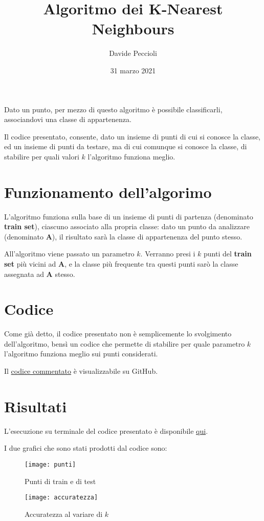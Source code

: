 \documentclass[a4paper]{article}
\title{Algoritmo dei K-Nearest Neighbours}
\date{31 marzo 2021}
\author{Davide Peccioli}
\begin{document}
\maketitle

Dato un punto, per mezzo di questo algoritmo è possibile classificarli, associandovi una classe di appartenenza.

Il codice presentato, consente, dato un insieme di punti di cui si conosce la classe, ed un insieme di punti da testare, ma di cui comunque si conosce la classe, di stabilire per quali valori $k$ l'algoritmo funziona meglio.

\section{Funzionamento dell'algorimo}

L'algoritmo funziona sulla base di un insieme di punti di partenza (denominato \textbf{train set}), ciascuno associato alla propria classe: dato un punto da analizzare (denominato \textbf{A}), il risultato sarà la classe di appartenenza del punto stesso.

All'algoritmo viene passato un parametro $k$. Verranno presi i $k$ punti del \textbf{train set} più vicini ad \textbf{A}, e la classe più frequente tra questi punti sarò la classe assegnata ad \textbf{A} stesso.

\section{Codice}

Come già detto, il codice presentato non è semplicemente lo svolgimento dell'algoritmo, bensì un codice che permette di stabilire per quale parametro $k$ l'algoritmo funziona meglio sui punti considerati.

Il \href{https://github.com/DavideP02/Octave_KNN_Peccioli5H/blob/main/KNN.m}{codice commentato} è visualizzabile su GitHub.

\section{Risultati}

L'esecuzione su terminale del codice presentato è disponibile \href{https://youtu.be/Dq0btd1xUEI}{qui}.

I due grafici che sono stati prodotti dal codice sono:
\begin{figure}
\centering
\texttt{[image: punti]}
\caption{Punti di train e di test}
\label{fig:punti}
\end{figure}
\begin{figure}
\centering
\texttt{[image: accuratezza]}
\caption{Accuratezza al variare di $k$}
\label{fig:acc}
\end{figure}
\end{document}
